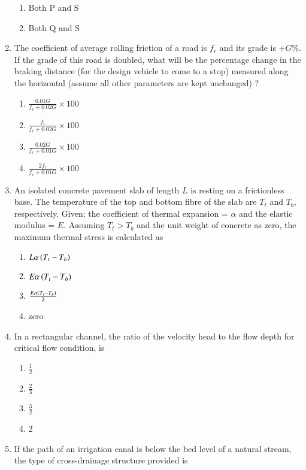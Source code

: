 \documentclass[journal]{IEEEtran}
\begin{document}
\begin{enumerate}
\begin{enumerate}
   \item Both P and S
   \item Both Q and S \\
\end{enumerate}
\item The coefficient of average rolling friction of a road is $f_r$ and its grade is +$G$\%. If the grade of this road is doubled, what will be the percentage change in the braking distance (for the design vehicle to come to a stop) measured along the horizontal (assume all other parameters are kept unchanged) ?
\begin{enumerate}
    \item $\frac{0.01 G}{f_r + 0.02 G} \times 100$
    \item $\frac{f_r}{f_r + 0.02 G} \times 100$
    \item $\frac{0.02 G}{f_r + 0.01 G} \times 100$
    \item $\frac{2 f_r}{f_r + 0.01 G} \times 100$ \\
\end{enumerate}
\item An isolated concrete pavement slab of length $L$ is resting on a frictionless base. The temperature of the top and bottom fibre of the slab are $T_t$ and $T_b$, respectively. Given: the coefficient of thermal expansion = $\alpha$ and the elastic modulus = $E$. Assuming $T_t > T_b$ and the unit weight of concrete as zero, the maximum thermal stress is calculated as
\begin{enumerate}
    \item $L \alpha \left(T_t - T_b\right)$
    \item $E \alpha \left(T_t - T_b\right)$
    \item $\frac{E \alpha \left(T_t - T_b\right)}{2}$
    \item zero \\
\end{enumerate}
\item In a rectangular channel, the ratio of the velocity head to the flow depth for critical flow condition, is
\begin{enumerate}
    \item $\frac{1}{2}$
    \item $\frac{2}{3}$
    \item $\frac{3}{2}$
    \item 2 \\
\end{enumerate}
\item If the path of an irrigation canal is below the bed level of a natural stream, the type of cross-drainage structure provided is

\end{enumerate}
\end{document}
